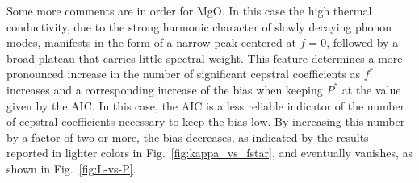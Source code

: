Some more comments are in order for MgO. In this case the high thermal conductivity, due to the strong harmonic character of slowly decaying phonon modes, manifests in the form of a narrow peak centered at $f=0$, followed by a broad plateau that carries little spectral weight. This feature determines a more pronounced increase in the number of significant cepstral coefficients as $f^*$ increases and a corresponding increase of the bias when keeping $P^*$ at the value given by the AIC. In this case, the AIC is a less reliable indicator of the number of cepstral coefficients necessary to keep the bias low. By increasing this number by a factor of two or more, the bias decreases, as indicated by the results reported in lighter colors in Fig.~\ref{fig:kappa_vs_fstar}, and eventually vanishes, as shown in Fig.~\ref{fig:L-vs-P}.

